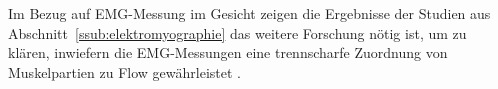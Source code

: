 Im Bezug auf EMG-Messung im Gesicht zeigen die Ergebnisse der Studien aus Abschnitt~\ref{ssub:elektromyographie} das weitere Forschung nötig ist, um zu klären, inwiefern die \ac{EMG}-Messungen eine trennscharfe Zuordnung von Muskelpartien zu Flow gewährleistet \citep{Peifer2012}.


